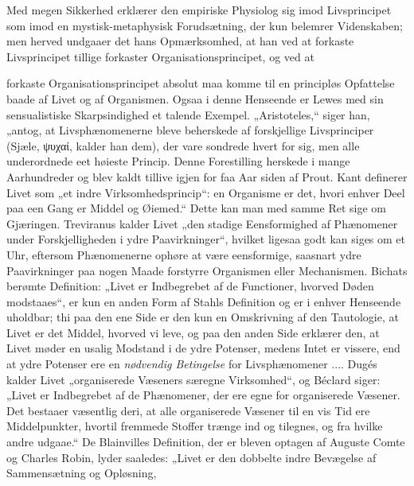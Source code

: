 \documentclass[12pt,a4paper]{book}
\begin{document}
Med megen Sikkerhed erklærer den empiriske Physiolog sig imod
Livsprincipet som imod en mystisk-metaphysisk Forudsætning, der kun
belemrer Videnskaben; men herved undgaaer det hans Opmærksomhed, at han
ved at forkaste Livsprincipet tillige forkaster Organisationsprincipet,
og ved at

forkaste Organisationsprincipet absolut maa komme til en principløs
Opfattelse baade af Livet og af Organismen. Ogsaa i denne Henseende er
Lewes med sin sensualistiske Skarpsindighed et talende Exempel.
„Aristoteles,“ siger han, „antog, at Livsphænomenerne bleve beherskede af
forskjellige Livsprinciper (Sjæle, ψυχαί, kalder han dem), der vare
sondrede hvert for sig, men alle underordnede eet høieste Princip. Denne
Forestilling herskede i mange Aarhundreder og blev kaldt tillive igjen
for faa Aar siden af Prout. Kant definerer Livet som „et indre
Virksomhedsprincip“: en Organisme er det, hvori enhver Deel paa een Gang
er Middel og Øiemed.“ Dette kan man med samme Ret sige om Gjæringen.
Treviranus kalder Livet „den stadige Eensformighed af Phænomener under
Forskjelligheden i ydre Paavirkninger“, hvilket ligesaa godt kan siges om
et Uhr, eftersom Phænomenerne ophøre at være eensformige, saasnart ydre
Paavirkninger paa nogen Maade forstyrre Organismen eller Mechanismen.
Bichats berømte Definition: „Livet er Indbegrebet af de Functioner,
hvorved Døden modstaaes“, er kun en anden Form af Stahls Definition og er
i enhver Henseende uholdbar; thi paa den ene Side er den kun en
Omskrivning af den Tautologie, at Livet er det Middel, hvorved vi leve,
og paa den anden Side erklærer den, at Livet møder en usalig Modstand i
de ydre Potenser, medens Intet er vissere, end at ydre Potenser ere en
\emph{nødvendig Betingelse} for Livsphænomener .... Dugés kalder Livet
„organiserede Væseners særegne Virksomhed“, og Béclard siger: „Livet er
Indbegrebet af de Phænomener, der ere egne for organiserede Væsener. Det
bestaaer væsentlig deri, at alle organiserede Væsener til en vis Tid ere
Middelpunkter, hvortil fremmede Stoffer trænge ind og tilegnes, og fra
hvilke andre udgaae.“ De Blainvilles Definition, der er bleven optagen af
Auguste Comte og Charles Robin, lyder saaledes: „Livet er den dobbelte
indre Bevægelse af Sammensætning og Opløsning,
\end{document}
